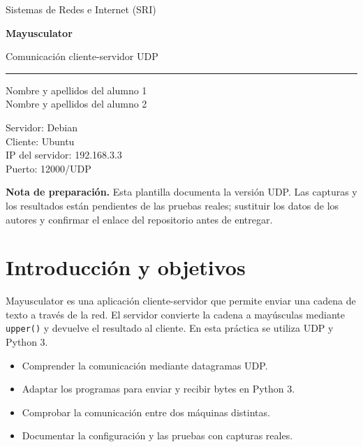 \documentclass[11pt,a4paper]{article}
\newcommand{\AlumnoUno}{Nombre y apellidos del alumno 1}
\newcommand{\AlumnoDos}{Nombre y apellidos del alumno 2}
\begin{document}
\begin{titlepage}
\centering
\vspace*{2.7cm}
{\Large Sistemas de Redes e Internet (SRI)\par}
\vspace{1.4cm}
{\color{azul}\Huge\bfseries Mayusculator\par}
\vspace{.45cm}
{\LARGE Comunicación cliente-servidor UDP\par}
\vspace{.5cm}{\large Adaptación a Python 3 y pruebas de red\par}
\par\vspace{1cm}\rule{.75\linewidth}{.5pt}\par\vspace{1cm}
{\large \AlumnoUno\\[.3cm]\AlumnoDos\par}
\vfill
{\large Servidor: Debian\\Cliente: Ubuntu\\IP del servidor: 192.168.3.3\\Puerto: 12000/UDP\par}
\vspace{1cm}{\large Curso 2026--2027\par}
\end{titlepage}
\tableofcontents
\vfill
\textbf{Nota de preparación.} Esta plantilla documenta la versión UDP. Las capturas y los resultados están pendientes de las pruebas reales; sustituir los datos de los autores y confirmar el enlace del repositorio antes de entregar.
\newpage
\section{Introducción y objetivos}
Mayusculator es una aplicación cliente-servidor que permite enviar una cadena de texto a través de la red. El servidor convierte la cadena a mayúsculas mediante \texttt{upper()} y devuelve el resultado al cliente. En esta práctica se utiliza UDP y Python 3.
\begin{itemize}
\item Comprender la comunicación mediante datagramas UDP.
\item Adaptar los programas para enviar y recibir bytes en Python 3.
\item Comprobar la comunicación entre dos máquinas distintas.
\item Documentar la configuración y las pruebas con capturas reales.
\end{itemize}
\end{document}
